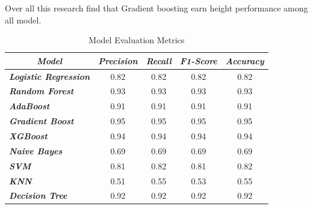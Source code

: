 \documentclass[conference]{IEEEtran} %
\begin{document}
Over all this research find that Gradient boosting earn height performance among all model.
\begin{table}[]
\centering
\caption{Model Evaluation Metrics}
\label{tab:evaluation}
\begin{tabular}{|l|ccc|c|}
\hline
\multicolumn{1}{|c|}{\textit{\textbf{Model}}} & \textit{\textbf{Precision}} & \textit{\textbf{Recall}} & \textit{\textbf{F1-Score}} & \textit{\textbf{Accuracy}} \\ \hline
\textit{\textbf{Logistic Regression}}         & 0.82                        & 0.82                     & 0.82                       & 0.82                       \\ \hline
\textit{\textbf{Random Forest}}               & 0.93                        & 0.93                     & 0.93                       & 0.93                       \\ \hline
\textit{\textbf{AdaBoost}}                    & 0.91                        & 0.91                     & 0.91                       & 0.91                       \\ \hline
\textit{\textbf{Gradient Boost}}              & 0.95                        & 0.95                     & 0.95                       & 0.95                       \\ \hline
\textit{\textbf{XGBoost}}                     & 0.94                        & 0.94                     & 0.94                       & 0.94                       \\ \hline
\textit{\textbf{Naive Bayes}}                 & 0.69                        & 0.69                     & 0.69                       & 0.69                       \\ \hline
\textit{\textbf{SVM}}                         & 0.81                        & 0.82                     & 0.81                       & 0.82                       \\ \hline
\textit{\textbf{KNN}}                         & 0.51                        & 0.55                     & 0.53                       & 0.55                       \\ \hline
\textit{\textbf{Decision Tree}}               & 0.92                        & 0.92                     & 0.92                       & 0.92                       \\ \hline
\end{tabular}
\end{table}
\FloatBarrier
\end{document}
